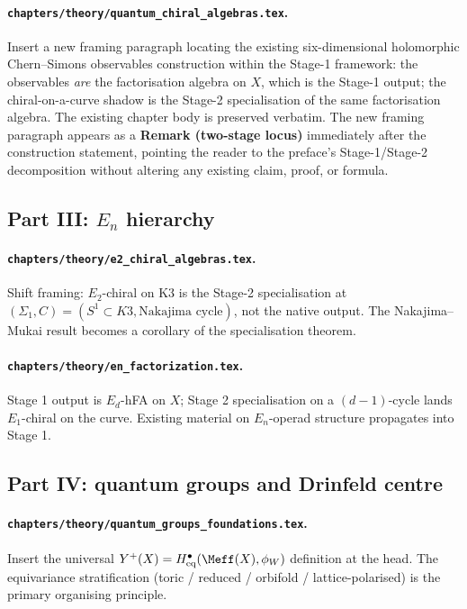 \paragraph{\texttt{chapters/theory/quantum\_chiral\_algebras.tex}.}
Insert a new framing paragraph locating the existing
six-dimensional holomorphic Chern--Simons observables construction
within the Stage-1 framework: the observables \emph{are} the
factorisation algebra on $X$, which is the Stage-1 output; the
chiral-on-a-curve shadow is the Stage-2 specialisation of the
same factorisation algebra. The existing chapter body is preserved
verbatim. The new framing paragraph appears as a \textbf{Remark
(two-stage locus)} immediately after the construction statement,
pointing the reader to the preface's Stage-1/Stage-2 decomposition
without altering any existing claim, proof, or formula.

\subsection*{Part III: $E_n$ hierarchy}

\paragraph{\texttt{chapters/theory/e2\_chiral\_algebras.tex}.} Shift
framing: $E_2$-chiral on K3 is the Stage-2 specialisation at
$(\Sigma_1, C) = (S^1 \subset K3, \text{Nakajima cycle})$, not
the native output. The Nakajima--Mukai result becomes a corollary
of the specialisation theorem.

\paragraph{\texttt{chapters/theory/en\_factorization.tex}.}
Stage 1 output is $E_d$-hFA on $X$; Stage 2 specialisation on a
$(d{-}1)$-cycle lands $E_1$-chiral on the curve. Existing material
on $E_n$-operad structure propagates into Stage 1.

\subsection*{Part IV: quantum groups and Drinfeld centre}

\paragraph{\texttt{chapters/theory/quantum\_groups\_foundations.tex}.}
Insert the universal $Y^+(X) =
H^{\bullet}_{\mathrm{eq}}(\Meff(X), \phi_W)$ definition at the
head. The equivariance stratification (toric / reduced / orbifold /
lattice-polarised) is the primary organising principle.


